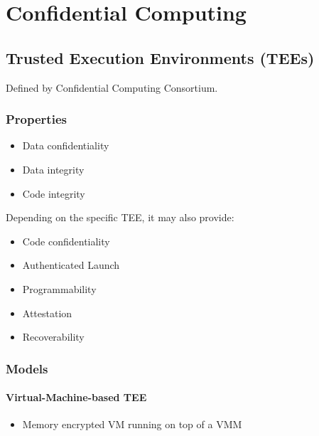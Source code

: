 
\chapter{Confidential Computing}
\label{ch:confidential-computing}

\section{Trusted Execution Environments (TEEs)}
\label{sec:TEE}

Defined by Confidential Computing Consortium.

\subsection{Properties}

\begin{itemize}
  \item Data confidentiality
  \item Data integrity
  \item Code integrity
\end{itemize}

Depending on the specific TEE, it may also provide:

\begin{itemize}
  \item Code confidentiality
  \item Authenticated Launch
  \item Programmability
  \item Attestation
  \item Recoverability
\end{itemize}

\subsection{Models}

\subsubsection{Virtual-Machine-based TEE}

\begin{itemize}
  \item Memory encrypted VM running on top of a VMM 
\end{itemize}

